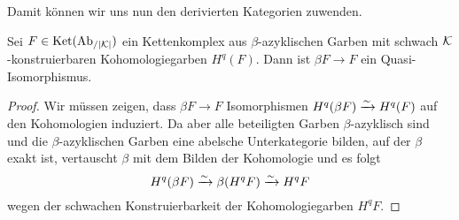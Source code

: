 Damit können wir uns nun den derivierten Kategorien zuwenden.
\begin{satz} \label{beta-qi}
  Sei $F \in \operatorname{Ket}(\operatorname{Ab}_{/|\mathcal{K}|})$ ein Kettenkomplex aus $\beta$-azyklischen
  Garben mit schwach $\mathcal{K}$-konstruierbaren Kohomologiegarben
  $H^q(F)$. Dann ist $\beta F \to F$ ein Quasi-Isomorphismus.
\end{satz}
\begin{proof}
  Wir müssen zeigen, dass $\beta F \to F$ Isomorphismen $H^q(\beta F)
  \xrightarrow[]{\sim} H^q(F)$ auf den Kohomologien induziert. Da aber alle
  beteiligten Garben $\beta$-azyklisch sind und die
  $\beta$-azyklischen Garben eine abelsche Unterkategorie bilden, auf
  der $\beta$ exakt ist, vertauscht $\beta$ mit dem Bilden der
  Kohomologie und es folgt
  \[ H^q(\beta F) \xrightarrow[]{\sim} \beta (H^q F) \xrightarrow[]{\sim} H^q F \]
  wegen der schwachen Konstruierbarkeit der Kohomologiegarben $H^q F$.
\end{proof}

